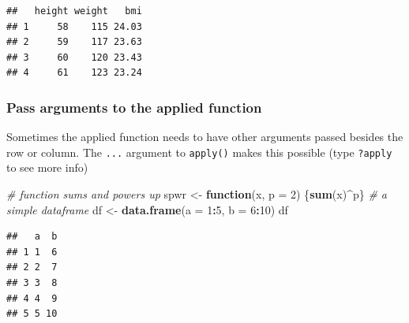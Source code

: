 \documentclass[]{book}
\newenvironment{Shaded}{\begin{snugshade}}{\end{snugshade}}
\newcommand{\CommentTok}[1]{\textcolor[rgb]{0.56,0.35,0.01}{\textit{#1}}}
\newcommand{\ControlFlowTok}[1]{\textcolor[rgb]{0.13,0.29,0.53}{\textbf{#1}}}
\newcommand{\DataTypeTok}[1]{\textcolor[rgb]{0.13,0.29,0.53}{#1}}
\newcommand{\DecValTok}[1]{\textcolor[rgb]{0.00,0.00,0.81}{#1}}
\newcommand{\KeywordTok}[1]{\textcolor[rgb]{0.13,0.29,0.53}{\textbf{#1}}}
\newcommand{\NormalTok}[1]{#1}
\newcommand{\OperatorTok}[1]{\textcolor[rgb]{0.81,0.36,0.00}{\textbf{#1}}}
\newcommand{\StringTok}[1]{\textcolor[rgb]{0.31,0.60,0.02}{#1}}
\begin{document}
\begin{Shaded}
\end{Shaded}

\begin{verbatim}
##   height weight   bmi
## 1     58    115 24.03
## 2     59    117 23.63
## 3     60    120 23.43
## 4     61    123 23.24
\end{verbatim}

\hypertarget{pass-arguments-to-the-applied-function}{%
\subsubsection*{Pass arguments to the applied function}\label{pass-arguments-to-the-applied-function}}

Sometimes the applied function needs to have other arguments passed besides the row or column. The \texttt{...} argument to \texttt{apply()} makes this possible (type \texttt{?apply} to see more info)

\begin{Shaded}
\begin{Highlighting}[]
\CommentTok{# function sums and powers up}
\NormalTok{spwr <-}\StringTok{ }\ControlFlowTok{function}\NormalTok{(x, }\DataTypeTok{p =} \DecValTok{2}\NormalTok{) \{}\KeywordTok{sum}\NormalTok{(x)}\OperatorTok{^}\NormalTok{p\}}
\CommentTok{# a simple dataframe}
\NormalTok{df <-}\StringTok{ }\KeywordTok{data.frame}\NormalTok{(}\DataTypeTok{a =} \DecValTok{1}\OperatorTok{:}\DecValTok{5}\NormalTok{, }\DataTypeTok{b =} \DecValTok{6}\OperatorTok{:}\DecValTok{10}\NormalTok{)}
\NormalTok{df}
\end{Highlighting}
\end{Shaded}

\begin{verbatim}
##   a  b
## 1 1  6
## 2 2  7
## 3 3  8
## 4 4  9
## 5 5 10
\end{verbatim}
\end{document}
